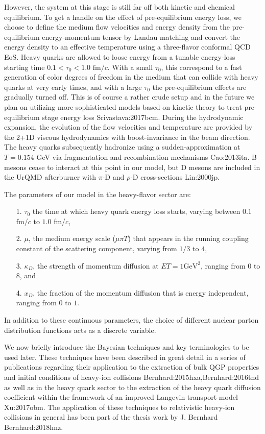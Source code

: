 However, the system at this stage is still far off both kinetic and chemical equilibrium.
To get a handle on the effect of pre-equilibrium energy loss, we choose to define the medium flow velocities and energy density from the pre-equilibrium energy-momentum tensor by Landau matching and convert the energy density to an effective temperature using a three-flavor conformal QCD EoS. 
Heavy quarks are allowed to loose energy from a tunable energy-loss starting time $0.1< \tau_0 < 1.0 \textrm{ fm/$c$} $. 
With a small $\tau_0$, this correspond to a fast generation of color degrees of freedom in the medium that can collide with heavy quarks at very early times, and with a large $\tau_0$ the pre-equilibrium effects are gradually turned off.
This is of course a rather crude setup and in the future we plan on utilizing more sophisticated models based on kinetic theory to treat pre-equilibrium stage energy loss {Srivastava:2017bcm}.
During the hydrodynamic expansion, the evolution of the flow velocities and temperature are provided by the 2+1D viscous hydrodynamics with boost-invariance in the beam direction.
The heavy quarks subsequently hadronize using a sudden-approximation at $T = 0.154$ GeV via fragmentation and recombination mechanisms {Cao:2013ita}. 
B mesons cease to interact at this point in our model, but D mesons are included in the UrQMD afterburner with $\pi$-D and $\rho$-D cross-sections {Lin:2000jp}.

The parameters of our model in the heavy-flavor sector are:
\begin{itemize}
\item[1.] $\tau_0$ the time at which heavy quark energy loss starts, varying between $0.1$ fm/$c$ to $1.0$ fm/$c$,
\item[2.] $\mu$, the medium energy scale ($\mu\pi T$) that appears in the running coupling constant of the scattering component, varying from $1/3$ to $4$,
\item[3.] $\kappa_D$, the strength of momentum diffusion at $ET = 1 \textrm{GeV}^2$, ranging from $0$ to $8$, and
\item[4.] $x_D$, the fraction of the momentum diffusion that is energy independent, ranging from $0$ to $1$.
\end{itemize}
In addition to these continuous parameters, the choice of different nuclear parton distribution functions acts as a discrete variable.

We now briefly introduce the Bayesian techniques and key terminologies to be used later. These techniques have been described in great detail in a series of publications regarding their application to the extraction of bulk QGP properties and initial conditions of heavy-ion collisions {Bernhard:2015hxa,Bernhard:2016tnd} as well as in the heavy quark sector to the extraction of the heavy quark diffusion coefficient within the framework of an improved Langevin transport model {Xu:2017obm}.
The application of these techniques to relativistic heavy-ion collisions in general has been part of the 
thesis work by J. Bernhard {Bernhard:2018hnz}.

